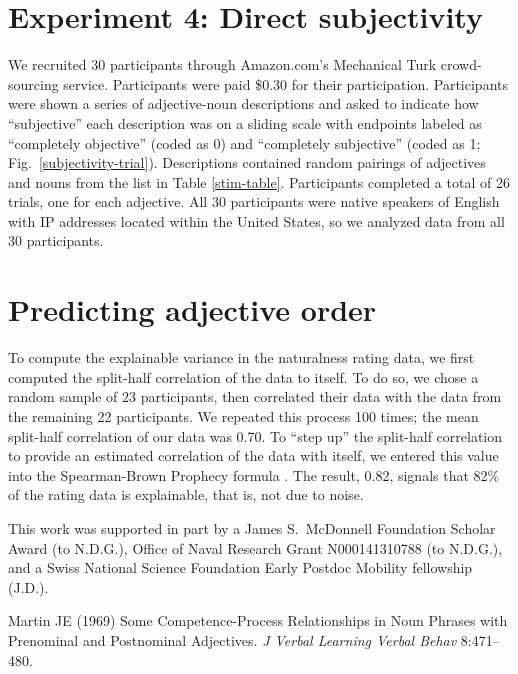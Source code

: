 \documentclass{pnastwo}
\begin{document}
\begin{article}
\begin{materials}
\section{Experiment 4: Direct subjectivity}
We recruited 30 participants through Amazon.com's Mechanical Turk crowd-sourcing service. Participants were paid \$0.30 for their participation. Participants were shown a series of adjective-noun descriptions and asked to indicate how ``subjective'' each description was on a sliding scale with endpoints labeled as ``completely objective'' (coded as 0) and ``completely subjective'' (coded as 1; Fig.~\ref{subjectivity-trial}). Descriptions contained random pairings of adjectives and nouns from the list in Table \ref{stim-table}. Participants completed a total of 26 trials, one for each adjective. All 30 participants were native speakers of English with IP addresses located within the United States, so we analyzed data from all 30 participants.

\section{Predicting adjective order}
To compute the explainable variance in the naturalness rating data, we first computed the split-half correlation of the data to itself. To do so, we chose a random sample of 23 participants, then correlated their data with the data from the remaining 22 participants. We repeated this process 100 times; the mean split-half correlation of our data was 0.70. To ``step up'' the split-half correlation to provide an estimated correlation of the data with itself, we entered this value into the Spearman-Brown Prophecy formula \cite{stanley1971}. The result, 0.82, signals that 82\% of the rating data is explainable, that is, not due to noise.

\end{materials}


\begin{acknowledgments}
This work was supported in part by a James S.~McDonnell Foundation Scholar Award (to N.D.G.), Office of Naval Research Grant N000141310788 (to N.D.G.), and a Swiss National Science Foundation Early Postdoc Mobility fellowship (J.D.).
\end{acknowledgments}

\begin{thebibliography}{10}

	Martin JE (1969) Some Competence-Process Relationships in Noun Phrases with Prenominal and Postnominal Adjectives. \emph{J Verbal Learning Verbal Behav} 8:471--480. 	
	

\end{thebibliography}
\end{article}
\end{document}
